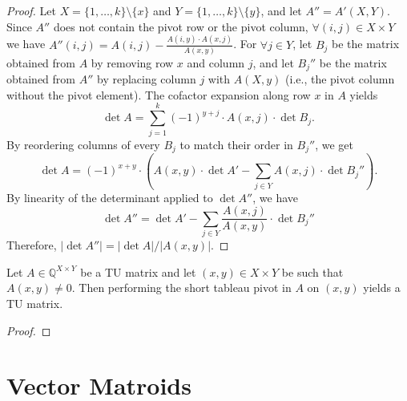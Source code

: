 \begin{proof}
    \leanok
    Let $X = \{1, \dots, k\} \setminus \{x\}$ and $Y = \{1, \dots, k\} \setminus \{y\}$, and let $A'' = A' (X, Y)$. Since $A''$ does not contain the pivot row or the pivot column, $\forall (i, j) \in X \times Y$ we have $A'' (i, j) = A (i, j) - \frac{A (i, y) \cdot A (x, j)}{A (x, y)}$. For $\forall j \in Y$, let $B_{j}$ be the matrix obtained from $A$ by removing row $x$ and column $j$, and let $B_{j}''$ be the matrix obtained from $A''$ by replacing column $j$ with $A (X, y)$ (i.e., the pivot column without the pivot element). The cofactor expansion along row $x$ in $A$ yields
    \[
        \det A = \sum_{j = 1}^{k} (-1)^{y + j} \cdot A (x, j) \cdot \det B_{j}.
    \]
    By reordering columns of every $B_{j}$ to match their order in $B_{j}''$, we get
    \[
        \det A = (-1)^{x + y} \cdot \left( A (x, y) \cdot \det A' - \sum_{j \in Y} A (x, j) \cdot \det B_{j}'' \right).
    \]
    By linearity of the determinant applied to $\det A''$, we have
    \[
        \det A'' = \det A' - \sum_{j \in Y} \frac{A (x, j)}{A (x, y)} \cdot \det B_{j}''
    \]
    Therefore, $|\det A''| = |\det A| / |A (x, y)|$.
\end{proof}

\begin{lemma}
    \label{Matrix.IsTotallyUnimodular.shortTableauPivot}
    \leanok
    Let $A \in \mathbb{Q}^{X \times Y}$ be a TU matrix and let $(x, y) \in X \times Y$ be such that $A (x, y) \neq 0$. Then performing the short tableau pivot in $A$ on $(x, y)$ yields a TU matrix.
\end{lemma}

\begin{proof}
    \leanok
    \SeeLean
\end{proof}


\section{Vector Matroids}

